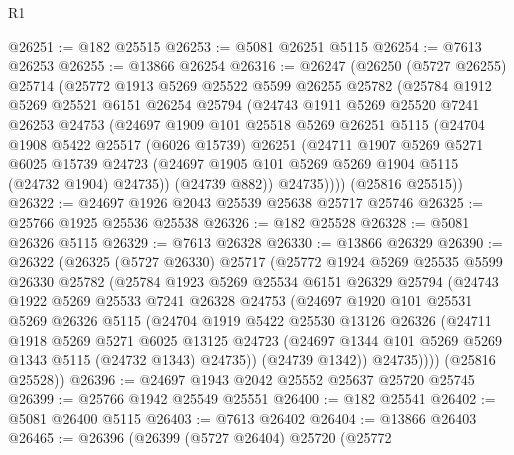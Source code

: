 \begin{lexlean}{R1}
\begin{coremodule}
@26251 := @182 @25515
@26253 := @5081 @26251 @5115
@26254 := @7613 @26253
@26255 := @13866 @26254
@26316 := @26247
    (@26250
      (@5727 @26255)
      @25714
      (@25772
        @1913
        @5269
        @25522
        @5599
        @26255
        @25782
        (@25784
          @1912
          @5269
          @25521
          @6151
          @26254
          @25794
          (@24743
            @1911
            @5269
            @25520
            @7241
            @26253
            @24753
            (@24697
              @1909
              @101
              @25518
              @5269
              @26251
              @5115
              (@24704
                @1908
                @5422
                @25517
                (@6026 @15739)
                @26251
                (@24711
                  @1907
                  @5269
                  @5271
                  @6025
                  @15739
                  @24723
                  (@24697 @1905 @101 @5269 @5269 @1904 @5115 (@24732 @1904) @24735))
                (@24739 @882))
              @24735))))
      (@25816 @25515))
@26322 := @24697 @1926 @2043 @25539 @25638 @25717 @25746
@26325 := @25766 @1925 @25536 @25538
@26326 := @182 @25528
@26328 := @5081 @26326 @5115
@26329 := @7613 @26328
@26330 := @13866 @26329
@26390 := @26322
    (@26325
      (@5727 @26330)
      @25717
      (@25772
        @1924
        @5269
        @25535
        @5599
        @26330
        @25782
        (@25784
          @1923
          @5269
          @25534
          @6151
          @26329
          @25794
          (@24743
            @1922
            @5269
            @25533
            @7241
            @26328
            @24753
            (@24697
              @1920
              @101
              @25531
              @5269
              @26326
              @5115
              (@24704
                @1919
                @5422
                @25530
                @13126
                @26326
                (@24711
                  @1918
                  @5269
                  @5271
                  @6025
                  @13125
                  @24723
                  (@24697 @1344 @101 @5269 @5269 @1343 @5115 (@24732 @1343) @24735))
                (@24739 @1342))
              @24735))))
      (@25816 @25528))
@26396 := @24697 @1943 @2042 @25552 @25637 @25720 @25745
@26399 := @25766 @1942 @25549 @25551
@26400 := @182 @25541
@26402 := @5081 @26400 @5115
@26403 := @7613 @26402
@26404 := @13866 @26403
@26465 := @26396
    (@26399
      (@5727 @26404)
      @25720
      (@25772

\end{coremodule}
\end{lexlean}
